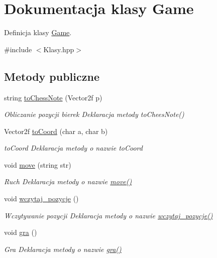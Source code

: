 \hypertarget{class_game}{\section{Dokumentacja klasy Game}
\label{class_game}
}


Definicja klasy \hyperlink{class_game}{Game}.  




{\ttfamily \#include $<$Klasy.\+hpp$>$}

\subsection*{Metody publiczne}
\begin{DoxyCompactItemize}
\item 
string \hyperlink{class_game_a6d7165691b0db379166a5e475a8123cf}{to\+Chess\+Note} (Vector2f p)
\begin{DoxyCompactList}\small\item\em Obliczanie pozycji bierek Deklaracja metody to\+Chees\+Note() \end{DoxyCompactList}\item 
Vector2f \hyperlink{class_game_afce31e4c33ae6dc68af4059259befd50}{to\+Coord} (char a, char b)
\begin{DoxyCompactList}\small\item\em to\+Coord Deklaracja metody o nazwie to\+Coord \end{DoxyCompactList}\item 
void \hyperlink{class_game_a513f58e893062649e01fb4233c85d563}{move} (string str)
\begin{DoxyCompactList}\small\item\em Ruch Deklaracja metody o nazwie \hyperlink{class_game_a513f58e893062649e01fb4233c85d563}{move()} \end{DoxyCompactList}\item 
void \hyperlink{class_game_a301b8329fd8738a7f42a2ed354a97648}{wczytaj\+\_\+pozycje} ()
\begin{DoxyCompactList}\small\item\em Wczytywanie pozycji Deklaracja metody o nazwie \hyperlink{class_game_a301b8329fd8738a7f42a2ed354a97648}{wczytaj\+\_\+pozycje()} \end{DoxyCompactList}\item 
void \hyperlink{class_game_adb42d5bef2d3268680d84adcc74b3b0a}{gra} ()
\begin{DoxyCompactList}\small\item\em Gra Deklaracja metody o nazwie \hyperlink{class_game_adb42d5bef2d3268680d84adcc74b3b0a}{gra()} \end{DoxyCompactList}\end{DoxyCompactItemize}


